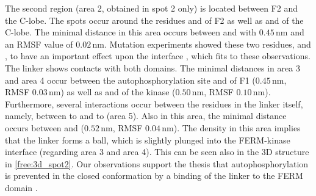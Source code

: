 The second region (area 2, obtained in spot 2 only) is located between F2 and the C-lobe. The spots occur around the residues  and  of F2 as well as  and  of the C-lobe. The minimal distance in this area occurs between  and  with $0.45\,\si{\nano\metre}$ and an RMSF value of $0.02\,\si{\nano\metre}$. Mutation experiments showed these two residues,  and , to have an important effect upon the interface \autocite{structFAK}, which fits to these observations.\\
The linker shows contacts with both domains. The minimal distances in area 3 and area 4 occur between the autophosphorylation site  and  of F1 ($0.45\,\si{\nano\metre}$, RMSF $0.03\,\si{\nano\metre}$) as well as  and  of the kinase ($0.50\,\si{\nano\metre}$, RMSF $0.10\,\si{\nano\metre}$). Furthermore, several interactions occur between the residues in the linker itself, namely, between  to  and  to  (area 5). Also in this area, the minimal distance occurs between  and  ($0.52\,\si{\nano\metre}$, RMSF $0.04\,\si{\nano\metre}$). The density in this area implies that the linker forms a ball, which is slightly plunged into the FERM-kinase interface (regarding area 3 and area 4). This can be seen also in the 3D structure in \autoref{free:3d_spot2}. Our observations support the thesis that autophosphorylation is prevented in the closed conformation by a binding of the linker to the FERM domain \autocite{pap003}.\\
%
%
%
